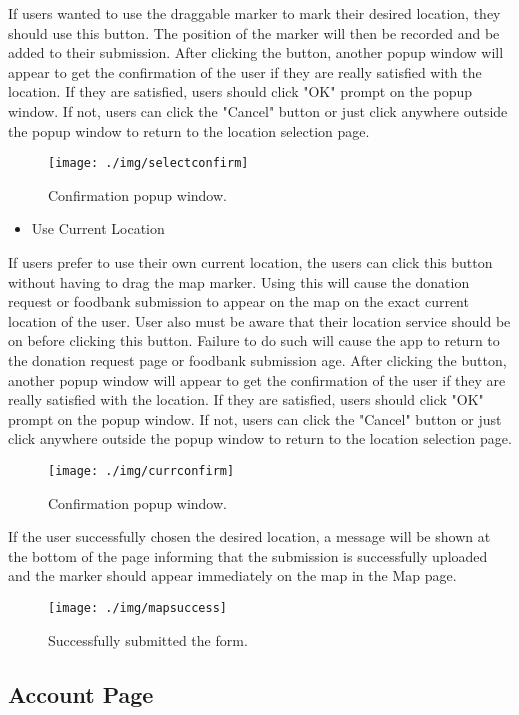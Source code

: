 \documentclass[conference]{IEEEtran}
\begin{document}
If users wanted to use the draggable marker to mark their desired location, they should use this button. The position of the marker will then be recorded and be added to their submission. After clicking the button, another popup window will appear to get the confirmation of the user if they are really satisfied with the location. If they are satisfied, users should click "OK" prompt on the popup window. If not, users can click the "Cancel" button or just click anywhere outside the popup window to return to the location selection page.

\begin{figure}[h!]
\texttt{[image: ./img/selectconfirm]}
\centering
\caption{Confirmation popup window.}
\end{figure}
\begin{itemize}
\item Use Current Location
\end{itemize}
If users prefer to use their own current location, the users can click this button without having to drag the map marker. Using this will cause the donation request or foodbank submission to appear on the map on the exact current location of the user. User also must be aware that their location service should be on before clicking this button. Failure to do such will cause the app to return to the donation request page or foodbank submission age. After clicking the button, another popup window will appear to get the confirmation of the user if they are really satisfied with the location. If they are satisfied, users should click "OK" prompt on the popup window. If not, users can click the "Cancel" button or just click anywhere outside the popup window to return to the location selection page. 

\begin{figure}[h!]
\texttt{[image: ./img/currconfirm]}
\centering
\caption{Confirmation popup window.}
\end{figure}
If the user successfully chosen the desired location, a message will be shown at the bottom of the page informing that the submission is successfully uploaded and the marker should appear immediately on the map in the Map page.

\begin{figure}[h!]
\texttt{[image: ./img/mapsuccess]}
\centering
\caption{Successfully submitted the form.}
\end{figure}

\subsection{Account Page}
\end{document}
